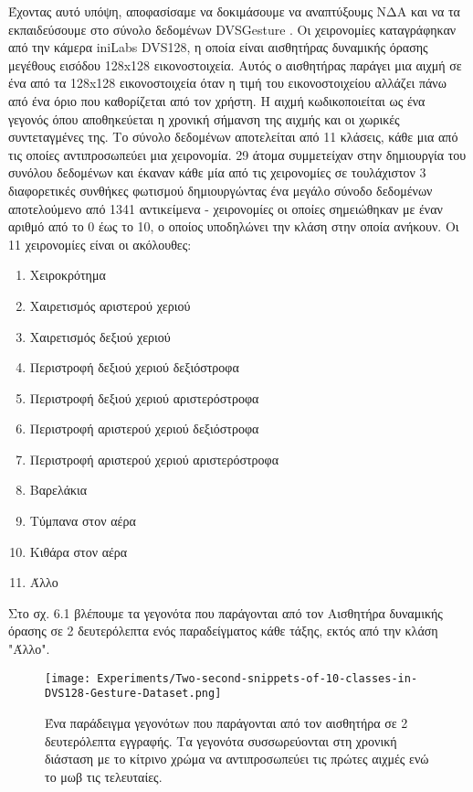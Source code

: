 \documentclass[12pt]{report}
\begin{document}
Έχοντας αυτό υπόψη, αποφασίσαμε να δοκιμάσουμε να αναπτύξουμς ΝΔΑ και να τα εκπαιδεύσουμε στο σύνολο δεδομένων \textlatin{DVSGesture} \cite{Amir2017}. Οι χειρονομίες καταγράφηκαν από την κάμερα \textlatin{iniLabs DVS128}, η οποία είναι αισθητήρας δυναμικής όρασης μεγέθους εισόδου 128x128 εικονοστοιχεία. Αυτός ο αισθητήρας παράγει μια αιχμή σε ένα από τα 128x128 εικονοστοιχεία όταν η τιμή του εικονοστοιχείου αλλάζει πάνω από ένα όριο που καθορίζεται από τον χρήστη. Η αιχμή κωδικοποιείται ως ένα γεγονός όπου αποθηκεύεται η χρονική σήμανση της αιχμής και οι χωρικές συντεταγμένες της. Το σύνολο δεδομένων αποτελείται από 11 κλάσεις, κάθε μια από τις οποίες αντιπροσωπεύει μια χειρονομία. 29 άτομα συμμετείχαν στην δημιουργία του συνόλου δεδομένων και έκαναν κάθε μία από τις χειρονομίες σε τουλάχιστον 3 διαφορετικές συνθήκες φωτισμού δημιουργώντας ένα μεγάλο σύνοδο δεδομένων αποτελούμενο από 1341 αντικείμενα - χειρονομίες οι οποίες σημειώθηκαν με έναν αριθμό από το 0 έως το 10, ο οποίος υποδηλώνει την κλάση στην οποία ανήκουν. Οι 11 χειρονομίες είναι οι ακόλουθες:
\begin{enumerate}
    \setcounter{enumi}{0}
    \item Χειροκρότημα
    \item Χαιρετισμός αριστερού χεριού
    \item Χαιρετισμός δεξιού χεριού
    \item Περιστροφή δεξιού χεριού δεξιόστροφα
    \item Περιστροφή δεξιού χεριού αριστερόστροφα
    \item Περιστροφή αριστερού χεριού δεξιόστροφα
    \item Περιστροφή αριστερού χεριού αριστερόστροφα
    \item Βαρελάκια
    \item Τύμπανα στον αέρα
    \item Κιθάρα στον αέρα
    \item Άλλο
\end{enumerate}

\medskip
Στο σχ. 6.1 βλέπουμε τα γεγονότα που παράγονται από τον Αισθητήρα δυναμικής όρασης σε 2 δευτερόλεπτα ενός παραδείγματος κάθε τάξης, εκτός από την κλάση "Άλλο".

\begin{figure}[htp] %
    \centering
     \texttt{[image: Experiments/Two-second-snippets-of-10-classes-in-DVS128-Gesture-Dataset.png]}
    \caption{Ένα παράδειγμα γεγονότων που παράγονται από τον αισθητήρα σε 2 δευτερόλεπτα εγγραφής. Τα γεγονότα συσσωρεύονται στη χρονική διάσταση με το κίτρινο χρώμα να αντιπροσωπεύει τις πρώτες αιχμές ενώ το μωβ τις τελευταίες.}
    \label{fig:representation-methods}
\end{figure}
\end{document}
